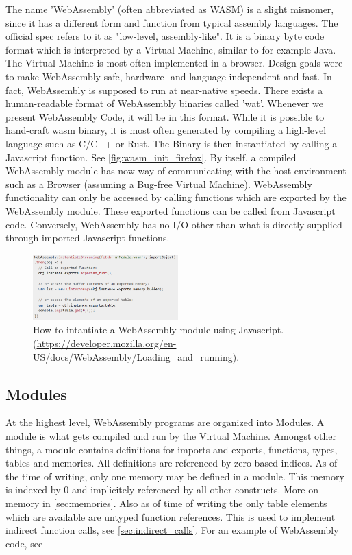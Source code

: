 \documentclass[sigconf]{acmart}
\begin{document}
The name 'WebAssembly' (often abbreviated as WASM) is a slight misnomer, since it has a different form and function from typical assembly languages. The official spec refers to it as "low-level, assembly-like". It is a binary byte code format which is interpreted by a Virtual Machine, similar to for example Java. The Virtual Machine is most often implemented in a browser. Design goals were to make WebAssembly safe, hardware- and language independent and fast. In fact, WebAssembly is supposed to run at near-native speeds. There exists a human-readable format of WebAssembly binaries called 'wat'. Whenever we present WebAssembly Code, it will be in this format. While it is possible to hand-craft wasm binary, it is most often generated by compiling a high-level language such as C/C++ or Rust. The Binary is then instantiated by calling a Javascript function. See \ref{fig:wasm_init_firefox}. By itself, a compiled WebAssembly module has now way of communicating with the host environment such as a Browser (assuming a Bug-free Virtual Machine). WebAssembly functionality can only be accessed by calling functions which are exported by the WebAssembly module. These exported functions can be called from Javascript code. Conversely, WebAssembly has no I/O other than what is directly supplied through imported Javascript functions. 

\begin{figure}[h]
  \centering
  \includegraphics[width=0.5\textwidth]{wasm_init_firefox}
  \caption{How to intantiate a WebAssembly module using Javascript. (\url{https://developer.mozilla.org/en-US/docs/WebAssembly/Loading_and_running}).}
\end{figure}


\subsection{Modules}
At the highest level, WebAssembly programs are organized into Modules.  A module is what gets compiled and run by the Virtual Machine. Amongst other things, a module contains definitions for imports and exports, functions, types, tables and memories. All definitions are referenced by zero-based indices. As of the time of writing, only one memory may be defined in a module. This memory is indexed by 0 and implicitely referenced by all other constructs. More on memory in \ref{sec:memories}. Also as of time of writing the only table elements which are available are untyped function references. This is used to implement indirect function calls, see \ref{sec:indirect_calls}. For an example of WebAssembly code, see 
\end{document}
